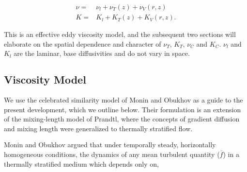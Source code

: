 \begin{eqnarray*}
 \nu =& \nu_{l} + \nu_{T}(z) + \nu_{V}(r,z) \\
 K =& K_{l} + K_{T}(z) + K_{V}(r,z).
\end{eqnarray*}

This is an effective eddy viscosity model, and the subsequent two
sections will elaborate on the spatial dependence and character of
$\nu_T$, $K_T$, $\nu_C$ and $K_C$. $\nu_l$ and $K_l$ are the laminar,
base diffusivities and do not vary in space. 

\subsection{Viscosity Model}

We use the celebrated similarity model of Monin and
Obukhov\cite{monin2007statistical,monin1954basic} as a guide to the
present development, which we outline below. Their formulation is an
extension of the mixing-length model of Prandtl, where the concepts of
gradient diffusion and mixing length were generalized to thermally
stratified flow.   

%
%

Monin and Obukhov argued that under temporally steady, horizontally
homogeneous conditions, the dynamics of any mean turbulent quantity
($\bar f$) in a thermally stratified medium which depends only on,  

